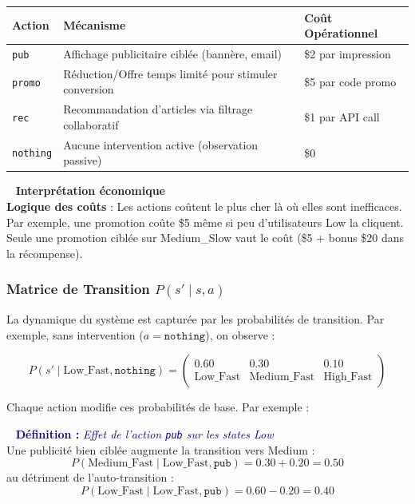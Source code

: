 \documentclass[11pt,a4paper]{article}
\newenvironment{defbox}[1]{%
  \vspace{3pt}\begin{framed}
  \noindent{\color{NavyBlue}\rule{0.3cm}{3pt}}~%
  \textcolor{DarkBlue}{\textbf{Définition :} \textit{#1}}\\[3pt]}
  {\end{framed}\vspace{3pt}}
\newenvironment{insightbox}{%
  \vspace{3pt}\begin{framed}
  \noindent{\color{NavyBlue}\rule{0.3cm}{3pt}}~%
  \textcolor{NavyBlue}{\textbf{Interprétation économique}}\\[3pt]}
  {\end{framed}\vspace{3pt}}
\begin{document}
\begin{center}
\begin{tabularx}{\linewidth}{|l|X|X|}
\hline
\textbf{Action} & \textbf{Mécanisme} & \textbf{Coût Opérationnel} \\
\hline
\rule{0pt}{3ex}
\texttt{pub} & Affichage publicitaire ciblée (bannère, email) & \$2 par impression \\
\hline
\rule{0pt}{3ex}
\texttt{promo} & Réduction/Offre temps limité pour stimuler conversion & \$5 par code promo \\
\hline
\rule{0pt}{3ex}
\texttt{rec} & Recommandation d'articles via filtrage collaboratif & \$1 par API call \\
\hline
\rule{0pt}{3ex}
\texttt{nothing} & Aucune intervention active (observation passive) & \$0 \\
\hline
\end{tabularx}
\end{center}

\begin{insightbox}
\textbf{Logique des coûts} : Les actions coûtent le plus cher là où elles sont inefficaces. Par exemple, une promotion coûte \$5 même si peu d'utilisateurs Low la cliquent. Seule une promotion ciblée sur Medium\_Slow vaut le coût (\$5 + bonus \$20 dans la récompense).
\end{insightbox}

\subsubsection{Matrice de Transition $P(s' \mid s, a)$}

La dynamique du système est capturée par les probabilités de transition. Par exemple, sans intervention ($a = \texttt{nothing}$), on observe :

\begin{equation}
P(s' \mid \text{Low\_Fast}, \texttt{nothing}) = \begin{pmatrix}
0.60 & 0.30 & 0.10 \\
\text{Low\_Fast} & \text{Medium\_Fast} & \text{High\_Fast}
\end{pmatrix}
\end{equation}

Chaque action modifie ces probabilités de base. Par exemple :

\begin{defbox}{Effet de l'action \texttt{pub} sur les states Low}
Une publicité bien ciblée augmente la transition vers Medium :
$$P(\text{Medium\_Fast} \mid \text{Low\_Fast}, \texttt{pub}) = 0.30 + 0.20 = 0.50$$
au détriment de l'auto-transition :
$$P(\text{Low\_Fast} \mid \text{Low\_Fast}, \texttt{pub}) = 0.60 - 0.20 = 0.40$$
\end{defbox}
\end{document}
